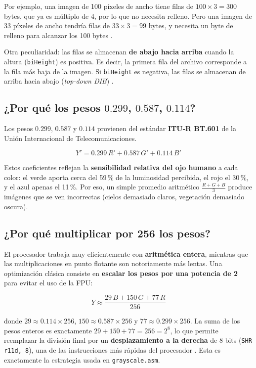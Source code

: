 \documentclass[12pt, letterpaper]{article}
\begin{document}
Por ejemplo, una imagen de 100 píxeles de ancho tiene filas de $100 \times 3 = 300$ bytes, que ya es múltiplo de 4, por lo que no necesita relleno. Pero una imagen de 33 píxeles de ancho tendría filas de $33 \times 3 = 99$ bytes, y necesita un byte de relleno para alcanzar los 100 bytes \cite{fileformat_bmp}.

Otra peculiaridad: las filas se almacenan \textbf{de abajo hacia arriba} cuando la altura (\texttt{biHeight}) es positiva. Es decir, la primera fila del archivo corresponde a la fila más baja de la imagen. Si \texttt{biHeight} es negativa, las filas se almacenan de arriba hacia abajo (\textit{top-down DIB}) \cite{microsoft_bitmapinfoheader}.

\subsection*{¿Por qué los pesos $0.299$, $0.587$, $0.114$?}

Los pesos $0.299$, $0.587$ y $0.114$ provienen del estándar \textbf{ITU-R BT.601} de la Unión Internacional de Telecomunicaciones.

\begin{equation}
    Y' = 0.299\,R' + 0.587\,G' + 0.114\,B'
\end{equation}

Estos coeficientes reflejan la \textbf{sensibilidad relativa del ojo humano} a cada color: el verde aporta cerca del 59\,\% de la luminosidad percibida, el rojo el 30\,\%, y el azul apenas el 11\,\%. Por eso, un simple promedio aritmético $\frac{R+G+B}{3}$ produce imágenes que se ven incorrectas (cielos demasiado claros, vegetación demasiado oscura).

\subsection*{¿Por qué multiplicar por 256 los pesos?}

El procesador trabaja muy eficientemente con \textbf{aritmética entera}, mientras que las multiplicaciones en punto flotante son notoriamente más lentas. Una optimización clásica consiste en \textbf{escalar los pesos por una potencia de 2} para evitar el uso de la FPU:

\begin{equation}
    Y \approx \frac{29\,B + 150\,G + 77\,R}{256}
\end{equation}

donde $29 \approx 0.114 \times 256$, $150 \approx 0.587 \times 256$ y $77 \approx 0.299 \times 256$. La suma de los pesos enteros es exactamente $29 + 150 + 77 = 256 = 2^8$, lo que permite reemplazar la división final por un \textbf{desplazamiento a la derecha} de 8 bits (\texttt{SHR r11d, 8}), una de las instrucciones más rápidas del procesador \cite{intel_manual}. Esta es exactamente la estrategia usada en \texttt{grayscale.asm}.
\end{document}
